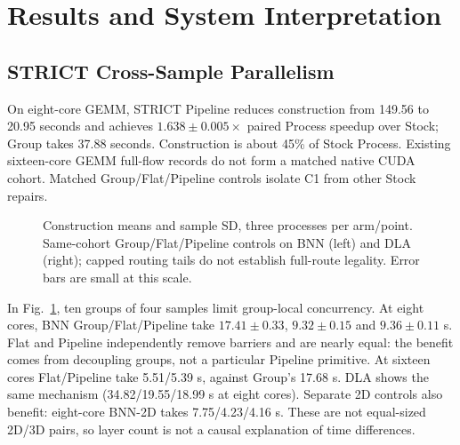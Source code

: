 \section{Results and System Interpretation}
\subsection{STRICT Cross-Sample Parallelism}
On eight-core GEMM, STRICT Pipeline reduces construction from 149.56 to 20.95 seconds and achieves $1.638\pm0.005\times$ paired Process speedup over Stock; Group takes 37.88 seconds. Construction is about 45\% of Stock Process. Existing sixteen-core GEMM full-flow records do not form a matched native CUDA cohort. Matched Group/Flat/Pipeline controls isolate C1 from other Stock repairs.

\begin{figure}[t]\centering
\caption{Construction means and sample SD, three processes per arm/point. Same-cohort Group/Flat/Pipeline controls on BNN (left) and DLA (right); capped routing tails do not establish full-route legality. Error bars are small at this scale.}\label{fig:causal}\end{figure}

In Fig.~\ref{fig:causal}, ten groups of four samples limit group-local concurrency. At eight cores, BNN Group/Flat/Pipeline take $17.41\pm0.33$, $9.32\pm0.15$ and $9.36\pm0.11$ s. Flat and Pipeline independently remove barriers and are nearly equal: the benefit comes from decoupling groups, not a particular Pipeline primitive. At sixteen cores Flat/Pipeline take 5.51/5.39 s, against Group's 17.68 s. DLA shows the same mechanism (34.82/19.55/18.99 s at eight cores). Separate 2D controls also benefit: eight-core BNN-2D takes 7.75/4.23/4.16 s. These are not equal-sized 2D/3D pairs, so layer count is not a causal explanation of time differences.

